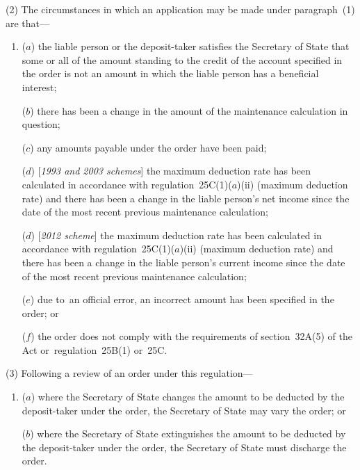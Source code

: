 \documentclass[12pt,a4paper]{article}
\begin{document}
(2) The circumstances in which an application may be made under paragraph~(1) are that—
\begin{enumerate}\item[]
($a$) the liable person or the deposit-taker satisfies the 
Secretary of State  %
that some or all of the amount standing to the credit of the account specified in the order is not an amount in which the liable person has a beneficial interest;

($b$) there has been a change in the amount of the maintenance calculation in question;

($c$) any amounts payable under the order have been paid;

($d$) [\emph{1993 and 2003 schemes}] the maximum deduction rate has been calculated in accordance with regulation~25C(1)($a$)(ii)  (maximum deduction rate) and there has been a change in the liable person's net income since the date of the most recent previous maintenance calculation;

($d$) [\emph{2012 scheme}] the maximum deduction rate has been calculated in accordance with regulation~25C(1)($a$)(ii)  (maximum deduction rate) and there has been a change in the liable person's 
current  %
income since the date of the most recent previous maintenance calculation;

($e$) due to~an official error, an incorrect amount has been specified in the order; or

($f$) the order does not comply with the requirements of section~32A(5) of the Act or~regulation~25B(1) or~25C.
\end{enumerate}

(3) Following a review of an order under this regulation—
\begin{enumerate}\item[]
($a$) where the 
Secretary of State  %
changes the amount to be deducted by the deposit-taker under the order, 
the Secretary of State  %
may vary the order; or

($b$) where the 
Secretary of State  %
extinguishes the amount to be deducted by the deposit-taker under the order, 
the Secretary of State  %
must discharge the order.
\end{enumerate}
\end{document}
